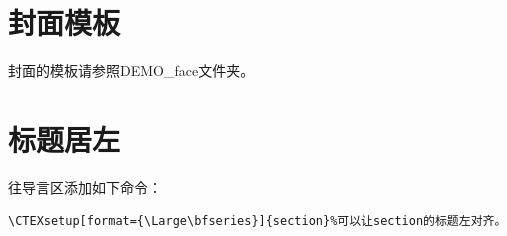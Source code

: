 \documentclass[a4paper,12pt]{ctexbook}
\begin{document}
\begin{flushleft}
\section{封面模板}
封面的模板请参照DEMO\_face文件夹。


\section{标题居左}
往导言区添加如下命令：
\begin{verbatim}
\CTEXsetup[format={\Large\bfseries}]{section}%可以让section的标题左对齐。
\end{verbatim}



\end{flushleft}



%
%

%
\end{document}
